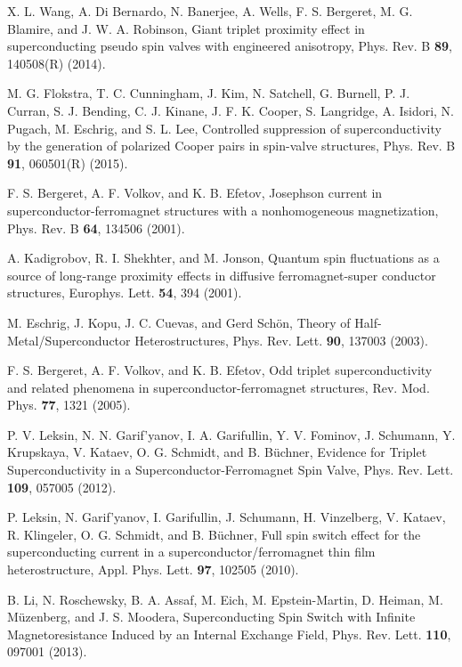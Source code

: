 \documentclass[prb,amsmath,amssymb,reprint]{revtex4-2}
\begin{document}
\begin{thebibliography}{99}
 X. L. Wang, A. Di Bernardo, N. Banerjee, A. Wells, F. S. Bergeret, M. G. Blamire, and J. W. A. Robinson, Giant triplet proximity effect in superconducting pseudo spin valves with engineered anisotropy, Phys. Rev. B \textbf{89}, 140508(R) (2014).

  M. G. Flokstra, T. C. Cunningham, J. Kim, N.
Satchell, G. Burnell, P. J. Curran, S. J. Bending, C. J. Kinane, J. F. K.
Cooper, S. Langridge, A. Isidori, N. Pugach, M. Eschrig, and S. L. Lee,
Controlled suppression of superconductivity by the generation of polarized Cooper pairs in spin-valve structures,
Phys. Rev. B \textbf{91}, 060501(R) (2015).

 F. S. Bergeret, A. F. Volkov, and K. B. Efetov,
Josephson current in superconductor-ferromagnet structures with a nonhomogeneous magnetization,
Phys.
Rev. B \textbf{64}, 134506 (2001).

 A. Kadigrobov, R. I. Shekhter, and M. Jonson,
Quantum spin fluctuations as a source of long-range proximity effects in diffusive ferromagnet-super conductor structures,
Europhys.
Lett. \textbf{54}, 394 (2001).

 M. Eschrig, J. Kopu, J. C. Cuevas, and Gerd Sch\"on,
Theory of Half-Metal/Superconductor Heterostructures,
Phys. Rev. Lett. \textbf{90}, 137003 (2003).


 F. S. Bergeret, A. F. Volkov, and K. B. Efetov,
Odd triplet superconductivity and related phenomena in superconductor-ferromagnet structures,
Rev. Mod. Phys. \textbf{77}, 1321 (2005).



  P. V. Leksin, N. N. Garif'yanov, I. A. Garifullin, Y.
V. Fominov, J. Schumann, Y. Krupskaya, V. Kataev, O. G. Schmidt, and B. B\"{u}chner,
Evidence for Triplet Superconductivity in a Superconductor-Ferromagnet Spin Valve,
Phys. Rev. Lett. \textbf{109}, 057005 (2012).

 P. Leksin, N. Garif'yanov, I. Garifullin, J. Schumann,
H. Vinzelberg, V. Kataev, R. Klingeler, O. G. Schmidt, and B. B\"{u}chner,
Full spin switch effect for the superconducting current in a superconductor/ferromagnet thin film heterostructure,
Appl. Phys. Lett. \textbf{97}, 102505 (2010).



 B. Li, N. Roschewsky, B. A. Assaf, M. Eich, M.
Epstein-Martin, D. Heiman, M. M\"{u}zenberg, and J. S. Moodera,
Superconducting Spin Switch with Infinite Magnetoresistance Induced by an Internal Exchange Field,
Phys. Rev. Lett. \textbf{110}, 097001 (2013).


\end{thebibliography}
\end{document}
